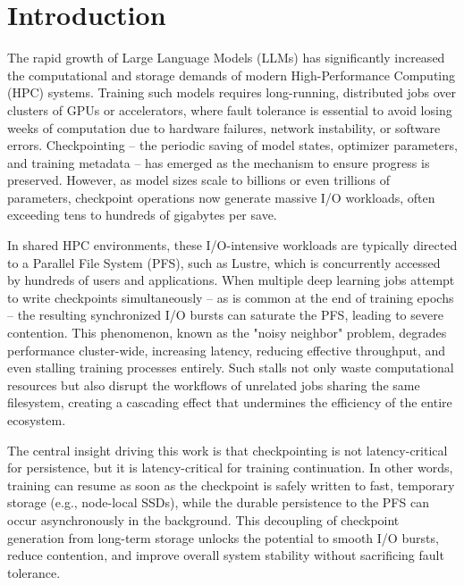 \documentclass[sigplan,twocolumn,10pt,nonacm]{acmart}
\begin{document}

\maketitle

\section{Introduction}

The rapid growth of Large Language Models (LLMs) has significantly increased the computational and storage demands of modern
High-Performance Computing (HPC) systems. Training such models requires long-running, distributed jobs over clusters of GPUs
or accelerators, where fault tolerance is essential to avoid losing weeks of computation due to hardware failures, network
instability, or software errors. Checkpointing -- the periodic saving of model states, optimizer parameters, and training
metadata -- has emerged as the mechanism to ensure progress is preserved. However, as model sizes scale to billions or
even trillions of parameters, checkpoint operations now generate massive I/O workloads, often exceeding tens to hundreds of
gigabytes per save.

In shared HPC environments, these I/O-intensive workloads are typically directed to a Parallel File System (PFS), such as
Lustre, which is concurrently accessed by hundreds of users and applications. When multiple deep learning jobs attempt
to write checkpoints simultaneously -- as is common at the end of training epochs -- the resulting synchronized I/O bursts can saturate
the PFS, leading to severe contention. This phenomenon, known as the "noisy neighbor" problem, degrades performance cluster-wide,
increasing latency, reducing effective throughput, and even stalling training processes entirely. Such stalls not only waste
computational resources but also disrupt the workflows of unrelated jobs sharing the same filesystem, creating a cascading effect
that undermines the efficiency of the entire ecosystem.

The central insight driving this work is that checkpointing is not latency-critical for persistence, but it is latency-critical
for training continuation. In other words, training can resume as soon as the checkpoint is safely written to fast, temporary
storage (e.g., node-local SSDs), while the durable persistence to the PFS can occur asynchronously in the background. This decoupling
of checkpoint generation from long-term storage unlocks the potential to smooth I/O bursts, reduce contention, and improve overall system
stability without sacrificing fault tolerance.
\end{document}
